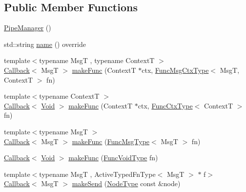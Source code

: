 \subsection*{Public Member Functions}
\begin{DoxyCompactItemize}
\item 
\hyperlink{structvt_1_1pipe_1_1_pipe_manager_aa2cf0e54dc146056c077aba1aa2ae42b}{Pipe\+Manager} ()
\item 
std\+::string \hyperlink{structvt_1_1pipe_1_1_pipe_manager_aad60c922d604dd1b9ff47e428d265eed}{name} () override
\item 
{\footnotesize template$<$typename MsgT , typename ContextT $>$ }\\\hyperlink{namespacevt_a36db99df4c973d48b1118a293fff533f}{Callback}$<$ MsgT $>$ \hyperlink{structvt_1_1pipe_1_1_pipe_manager_adb73a299b634a180ae3814b41b9ce255}{make\+Func} (ContextT $\ast$ctx, \hyperlink{structvt_1_1pipe_1_1_pipe_manager_base_a73fdf82ece0411b3dc644c99b763f7a9}{Func\+Msg\+Ctx\+Type}$<$ MsgT, ContextT $>$ fn)
\item 
{\footnotesize template$<$typename ContextT $>$ }\\\hyperlink{namespacevt_a36db99df4c973d48b1118a293fff533f}{Callback}$<$ \hyperlink{structvt_1_1pipe_1_1_pipe_manager_ab720c2580ecfd3ab36e49aeaaff64cc6}{Void} $>$ \hyperlink{structvt_1_1pipe_1_1_pipe_manager_a53201c2a1d558751fd3f2473a86678ab}{make\+Func} (ContextT $\ast$ctx, \hyperlink{structvt_1_1pipe_1_1_pipe_manager_base_ad8463823b6b4cfdb67c119d6d22e3bac}{Func\+Ctx\+Type}$<$ ContextT $>$ fn)
\item 
{\footnotesize template$<$typename MsgT $>$ }\\\hyperlink{namespacevt_a36db99df4c973d48b1118a293fff533f}{Callback}$<$ MsgT $>$ \hyperlink{structvt_1_1pipe_1_1_pipe_manager_af51eea8377c2ee25afeaabc891b86ee2}{make\+Func} (\hyperlink{structvt_1_1pipe_1_1_pipe_manager_base_aa54eee64ab32a27777a672d49eb861f4}{Func\+Msg\+Type}$<$ MsgT $>$ fn)
\item 
\hyperlink{namespacevt_a36db99df4c973d48b1118a293fff533f}{Callback}$<$ \hyperlink{structvt_1_1pipe_1_1_pipe_manager_ab720c2580ecfd3ab36e49aeaaff64cc6}{Void} $>$ \hyperlink{structvt_1_1pipe_1_1_pipe_manager_a073827ad7a9c387e8f0e28bc1767f641}{make\+Func} (\hyperlink{structvt_1_1pipe_1_1_pipe_manager_base_acd6f0c71f38f08d53f85e83b65406d77}{Func\+Void\+Type} fn)
\item 
{\footnotesize template$<$typename MsgT , Active\+Typed\+Fn\+Type$<$ Msg\+T $>$ $\ast$ f$>$ }\\\hyperlink{namespacevt_a36db99df4c973d48b1118a293fff533f}{Callback}$<$ MsgT $>$ \hyperlink{structvt_1_1pipe_1_1_pipe_manager_a73583be6260418b13ee66e56cdade2da}{make\+Send} (\hyperlink{namespacevt_a866da9d0efc19c0a1ce79e9e492f47e2}{Node\+Type} const \&node)

\end{DoxyCompactItemize}
